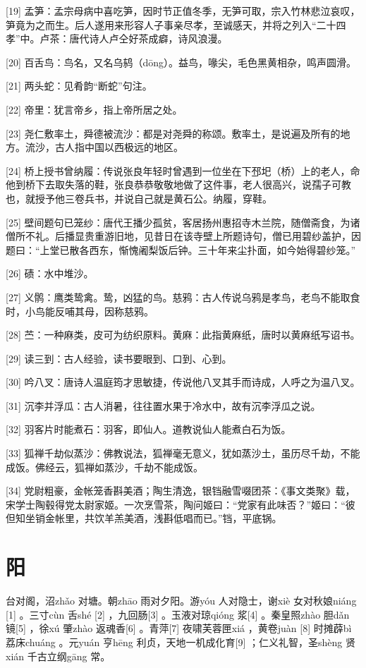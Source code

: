 \documentclass[12pt,UTF8]{ctexbook}
\begin{document}
[19] 孟笋：孟宗母病中喜吃笋，因时节正值冬季，无笋可取，宗入竹林悲泣哀叹，笋竟为之而生。后人遂用来形容人子事亲尽孝，至诚感天，并将之列入“二十四孝”中。卢茶：唐代诗人卢仝好茶成癖，诗风浪漫。

[20] 百舌鸟：鸟名，又名乌鸫（dōng）。益鸟，喙尖，毛色黑黄相杂，鸣声圆滑。

[21] 两头蛇：见肴韵“断蛇”句注。

[22] 帝里：犹言帝乡，指上帝所居之处。

[23] 尧仁敷率土，舜德被流沙：都是对尧舜的称颂。敷率土，是说遍及所有的地方。流沙，古人指中国以西极远的地区。

[24] 桥上授书曾纳履：传说张良年轻时曾遇到一位坐在下邳圯（桥）上的老人，命他到桥下去取失落的鞋，张良恭恭敬敬地做了这件事，老人很高兴，说孺子可教也，就授予他三卷兵书，并说自己就是黄石公。纳履，穿鞋。

[25] 壁间题句已笼纱：唐代王播少孤贫，客居扬州惠招寺木兰院，随僧斋食，为诸僧所不礼。后播显贵重游旧地，见昔日在该寺壁上所题诗句，僧已用碧纱盖护，因题曰：“上堂已散各西东，惭愧阇梨饭后钟。三十年来尘扑面，如今始得碧纱笼。”

[26] 碛：水中堆沙。

[27] 义鹘：鹰类鸷禽。鸷，凶猛的鸟。慈鸦：古人传说乌鸦是孝鸟，老鸟不能取食时，小鸟能反哺其母，因称慈鸦。

[28] 苎：一种麻类，皮可为纺织原料。黄麻：此指黄麻纸，唐时以黄麻纸写诏书。

[29] 读三到：古人经验，读书要眼到、口到、心到。

[30] 吟八叉：唐诗人温庭筠才思敏捷，传说他八叉其手而诗成，人呼之为温八叉。

[31] 沉李并浮瓜：古人消暑，往往置水果于冷水中，故有沉李浮瓜之说。

[32] 羽客片时能煮石：羽客，即仙人。道教说仙人能煮白石为饭。

[33] 狐禅千劫似蒸沙：佛教说法，狐禅毫无意义，犹如蒸沙土，虽历尽千劫，不能成饭。佛经云，狐禅如蒸沙，千劫不能成饭。

[34] 党尉粗豪，金帐笼香斟美酒；陶生清逸，银铛融雪啜团茶：《事文类聚》载，宋学士陶毂得党太尉家姬。一次烹雪茶，陶问姬曰：“党家有此味否？”姬曰：“彼但知坐销金帐里，共饮羊羔美酒，浅斟低唱而已。”铛，平底锅。





\chapter{阳}


台对阁，沼zhǎo 对塘。朝zhāo 雨对夕阳。游yóu 人对隐士，谢xiè 女对秋娘niáng [1] 。三寸cùn 舌shé [2] ，九回肠[3] 。玉液对琼qióng 浆[4] 。秦皇照zhào 胆dǎn 镜[5] ，徐xú 肇zhào 返魂香[6] 。青萍[7] 夜啸芙蓉匣xiá ，黄卷juàn [8] 时摊薜bì 荔床chuáng 。元yuán 亨hēng 利贞，天地一机成化育[9] ；仁义礼智，圣shèng 贤xián 千古立纲gāng 常。
\end{document}
